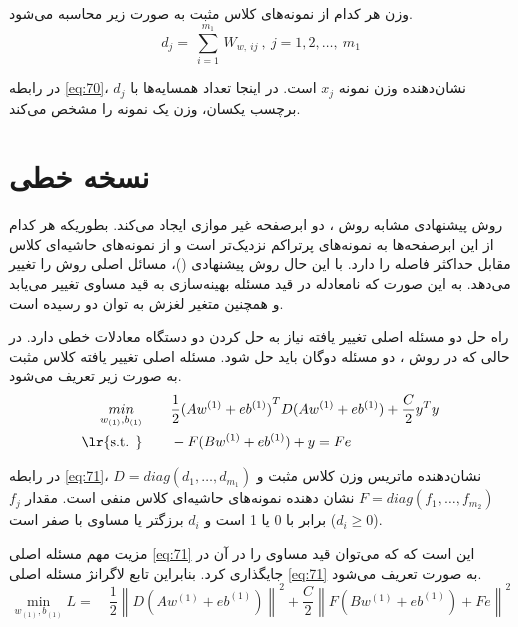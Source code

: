 وزن هر کدام از نمونه‌های کلاس مثبت به صورت زیر محاسبه می‌شود.
\begin{equation}\label{eq:70}
{{d}_{j}}=~\underset{i=1}{\overset{{{m}_{1}}}{\mathop \sum }}\,{{W}_{w,~ij}}~,~j=1,2,\ldots ,~{{m}_{1}}
\end{equation}

در رابطه \ref{eq:70}، $d_j$  نشان‌دهنده وزن نمونه $x_j$ است. در اینجا تعداد همسایه‌ها با برچسب یکسان، وزن یک نمونه را مشخص می‌کند.

\section{نسخه خطی}\label{sec:2:3}
روش پیشنهادی مشابه روش ، دو ابرصفحه غیر موازی ایجاد می‌کند. بطوریکه هر کدام از این ابرصفحه‌ها به نمونه‌های پرتراکم نزدیک‌تر است و از نمونه‌های حاشیه‌ای کلاس مقابل حداکثر فاصله را دارد. با این حال روش پیشنهادی ()، مسائل اصلی روش  را تغییر می‌دهد. به این صورت که نامعادله در قید مسئله بهینه‌سازی به قید مساوی تغییر می‌یابد و همچنین متغیر لغزش به توان دو رسیده است.

راه حل دو مسئله اصلی تغییر یافته نیاز به حل کردن دو دستگاه معادلات خطی دارد. در حالی که در روش ، دو مسئله دوگان باید حل شود. مسئله اصلی تغییر یافته کلاس مثبت به صورت زیر تعریف می‌شود.
\begin{equation}\label{eq:71}
\begin{split}
\mathop{{ min}}\limits_{w_{(1)} ,b_{(1)}} \qquad & \frac{1}{2}{{(A{{w}^{\left( 1 \right)}}+e{{b}^{\left( 1 \right)}})}^{T}}D(A{{w}^{\left( 1 \right)}} +e{{b}^{\left( 1 \right)}}) +\frac{C}{2}{{y}^{T}}y \\
\textrm{\lr{s.t. }} \qquad & -F(B{{w}^{\left( 1 \right)}}+e{{b}^{\left( 1 \right)}})+y=Fe
\end{split}
\end{equation} 

 در رابطه \ref{eq:71}،  $D=diag(d_1,\dots,d_{m_{1}})$ نشان‌دهنده ماتریس وزن کلاس مثبت و $F=diag(f_1,\dots, f_{m_{2}})$ نشان دهنده نمونه‌های حاشیه‌ای کلاس منفی است. مقدار $f_j$ برابر با 0 یا 1 است و $d_i$ برزگتر یا مساوی با صفر است ($d_i \geq 0$).
 
 مزیت مهم مسئله اصلی \ref{eq:71} این است که که می‌توان قید مساوی را در آن در جایگذاری کرد. بنابراین تابع لاگرانژ مسئله اصلی \ref{eq:71} به صورت تعریف می‌شود.
\begin{equation}\label{eq:72}
 \mathop{{ min}}\limits_{w_{(1)} ,b_{(1)}} L = \quad \frac{1}{2}{{\left\| D(A{{w}^{(1)}}+{{e}}{{b}^{(1)}}) \right\|}^{2}} +{\frac{C}{2}}{{\left\|F( B{{w}^{(1)}}+{{e}}{{b}^{(1)}})+F{e} \right\|}^{2}}
\end{equation}

